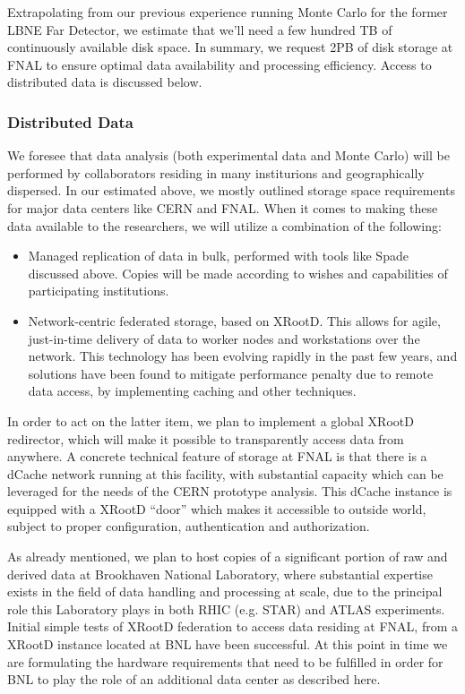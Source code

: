 Extrapolating from our previous experience running Monte Carlo for the former LBNE Far Detector, we estimate that we'll need a few hundred TB of continuously available
disk space. In summary, we request 2PB of disk storage at FNAL to ensure optimal data availability and processing efficiency. Access to distributed data is discussed below.

\subsubsection{Distributed Data}
We foresee that data analysis (both experimental data and Monte Carlo) will be performed by collaborators residing in many institurions and geographically dispersed. In our
estimated above, we mostly outlined storage space requirements for major data centers like CERN and FNAL. When it comes to making these data available to the researchers,
we will utilize a combination of the following:
\begin{itemize}
\item Managed replication of data in bulk, performed with tools like Spade discussed above. Copies will be made according to wishes and capabilities of participating institutions.
\item Network-centric federated storage, based on XRootD. This allows for agile, just-in-time delivery of data to worker nodes and workstations over the network. This
technology has been evolving rapidly in the past few years, and solutions have been found to mitigate performance penalty due to remote data access, by implementing caching
and other techniques.
\end{itemize}

In order to act on the latter item, we plan to implement a global XRootD redirector, which will make it possible to transparently access data from anywhere.
A concrete technical feature of storage at FNAL is that there is a dCache network running at this facility, with substantial capacity which can be leveraged
for the needs of the CERN prototype analysis. This dCache instance is equipped with a XRootD ``door'' which makes it accessible to outside world, subject
to proper configuration, authentication and authorization.

As already mentioned, we plan to host copies of a significant portion of raw and derived data at Brookhaven National Laboratory, where substantial expertise
exists in the field of data handling and processing at scale, due to the principal role this Laboratory plays in both RHIC (e.g. STAR) and ATLAS experiments.
Initial simple tests of XRootD federation to access data residing at FNAL, from a XRootD instance located at BNL have been successful. At this point in time we
are formulating the hardware requirements that need to be fulfilled in order for BNL to play the role of an additional data center as described here.


